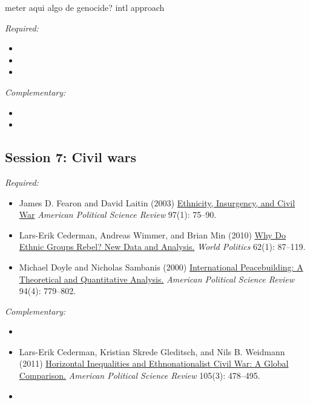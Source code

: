 \documentclass[12pt, a4paper]{article}
\begin{document}
meter aqui algo de genocide? intl approach

\noindent\textit{Required:}

\begin{itemize}
  \item
  \item
  \item
\end{itemize}

\noindent\textit{Complementary:}

\begin{itemize}
  \item
  \item
\end{itemize}

\hline
\subsection*{Session 7: Civil wars}

\noindent\textit{Required:}

\begin{itemize}
  \item James D. Fearon and David Laitin (2003) \href{https://doi.org/10.1017/S0003055403000534}{Ethnicity, Insurgency, and Civil War} \textit{American Political Science Review} 97(1): 75--90.
  \item Lars-Erik Cederman, Andreas Wimmer, and Brian Min (2010) \href{https://doi.org/10.1017/S0043887109990219}{Why Do Ethnic Groups Rebel? New Data and Analysis.} \textit{World Politics} 62(1): 87--119.
  \item Michael Doyle and Nicholas Sambanis (2000) \href{https://doi.org/10.2307/2586208}{International Peacebuilding: A Theoretical and Quantitative Analysis.} \textit{American Political Science Review} 94(4): 779--802.
\end{itemize}

\noindent\textit{Complementary:}

\begin{itemize}
  \item \item Lars-Erik Cederman, Kristian Skrede Gleditsch, and Nils B. Weidmann (2011) \href{https://doi.org/10.1017/S0003055411000207}{Horizontal Inequalities and Ethnonationalist Civil War: A Global Comparison.} \textit{American Political Science Review} 105(3): 478--495.
  \item
\end{itemize}
\end{document}
